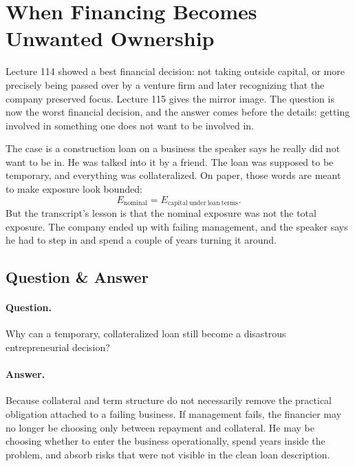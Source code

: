 \documentclass[11pt,oneside]{book}
\begin{document}

\section{When Financing Becomes Unwanted Ownership}

Lecture 114 showed a best financial decision: not taking outside capital, or more precisely being passed over by a venture firm and later recognizing that the company preserved focus. Lecture 115 gives the mirror image. The question is now the worst financial decision, and the answer comes before the details: getting involved in something one does not want to be involved in.

The case is a construction loan on a business the speaker says he really did not want to be in. He was talked into it by a friend. The loan was supposed to be temporary, and everything was collateralized. On paper, those words are meant to make exposure look bounded:
\[
E_{\mathrm{nominal}}
=
E_{\mathrm{capital\ under\ loan\ terms}}.
\]
But the transcript's lesson is that the nominal exposure was not the total exposure. The company ended up with failing management, and the speaker says he had to step in and spend a couple of years turning it around.

\subsection{Question \& Answer}

\paragraph{Question.}
Why can a temporary, collateralized loan still become a disastrous entrepreneurial decision?

\paragraph{Answer.}
Because collateral and term structure do not necessarily remove the practical obligation attached to a failing business. If management fails, the financier may no longer be choosing only between repayment and collateral. He may be choosing whether to enter the business operationally, spend years inside the problem, and absorb risks that were not visible in the clean loan description.
\end{document}
